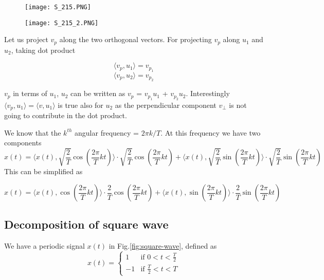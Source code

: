 \begin{figure}[ht]
\centering
\texttt{[image: S\_215.PNG]}		
\end{figure}

 \begin{figure}[ht]
\centering
\texttt{[image: S\_215\_2.PNG]}		
\end{figure}

\noindent
Let us project $v_p$ along the two orthogonal vectors. 
  For projecting  $v_p$  along $u_1$ and $u_2$, taking dot product 
 
\begin{equation*} \langle v_p, u_1 \rangle =v_{p_1} \end{equation*}
\begin{equation*} \langle v_p, u_2 \rangle = v_{p_2} \end{equation*}
 
\noindent
$v_p$  in terms of $u_1$, $u_2$ can be written as $v_p$  = $v_{p_1}u_1$ + $v_{p_2}u_2$. Interestingly  $\langle v_p, u_1 \rangle = \langle v, u_1 \rangle$ is true also for $u_2$ as the perpendicular component $v_\perp$ is not going to contribute in the dot product. 
        
We know that the $k^{th}$ angular frequency =  $2 \pi k/T$.
At this frequency we have two components 
\begin{equation*}x(t) = \langle x(t), \sqrt{\frac{2}{T}}\cos (\frac{2\pi}{T}kt)\rangle \cdot \sqrt{\frac{2}{T}}\cos (\frac{2\pi}{T}kt) + \langle x(t), \sqrt{\frac{2}{T}}\sin (\frac{2\pi}{T}kt)\rangle \cdot \sqrt{\frac{2}{T}}\sin (\frac{2\pi}{T}kt)\end{equation*}
This can be simplified as

\begin{equation*}x(t) = \langle x(t), \cos (\frac{2\pi}{T}kt)\rangle \cdot \frac{2}{T}\cos (\frac{2\pi}{T}kt) + \langle x(t), \sin (\frac{2\pi}{T}kt)\rangle \cdot \frac{2}{T}\sin (\frac{2\pi}{T}kt)\end{equation*}

\noindent
\subsection{Decomposition of square wave}
We have a periodic signal $x(t)$ in Fig.\ref{fig:square-wave}, defined as
\[
x(t) =
\left\{
	\begin{array}{ll}
		1  & \mbox{if } 0 < t < \frac{T}{2} \\
		-1 & \mbox{if } \frac{T}{2} < t < T
	\end{array}
\right.
 \]

